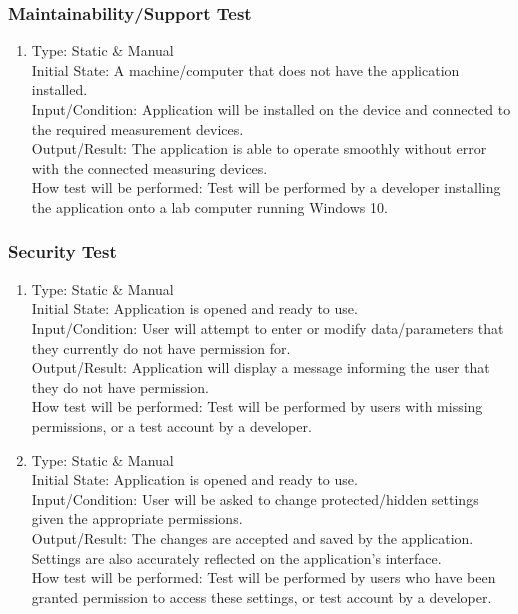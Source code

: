 \documentclass[12pt, titlepage]{article}
\begin{document}
\subsubsection{Maintainability/Support Test}

\begin{adjustwidth}{2.2em}{0pt}
\begin{enumerate}[{NF-MT}1.]
    \item Type: Static \& Manual\\
    Initial State: A machine/computer that does not have the application installed.\\
    Input/Condition: Application will be installed on the device and connected to the required measurement devices.\\
    Output/Result: The application is able to operate smoothly without error with the connected measuring devices.\\
    How test will be performed: Test will be performed by a developer installing the application onto a lab computer running Windows 10.
\end{enumerate}
\end{adjustwidth}

\subsubsection{Security Test}

\begin{adjustwidth}{2.2em}{0pt}
\begin{enumerate}[{NF-ST}1.]
    \item Type: Static \& Manual\\
    Initial State: Application is opened and ready to use.\\
    Input/Condition: User will attempt to enter or modify data/parameters that they currently do not have permission for.\\
    Output/Result: Application will display a message informing the user that they do not have permission.\\
    How test will be performed: Test will be performed by users with missing permissions, or a test account by a developer.
    
    \item Type: Static \& Manual\\
    Initial State: Application is opened and ready to use.\\
    Input/Condition: User will be asked to change protected/hidden settings given the appropriate permissions.\\
    Output/Result: The changes are accepted and saved by the application. Settings are also accurately reflected on the application's interface.\\
    How test will be performed: Test will be performed by users who have been granted permission to access these settings, or test account by a developer.
\end{enumerate}
\end{adjustwidth}
\end{document}
